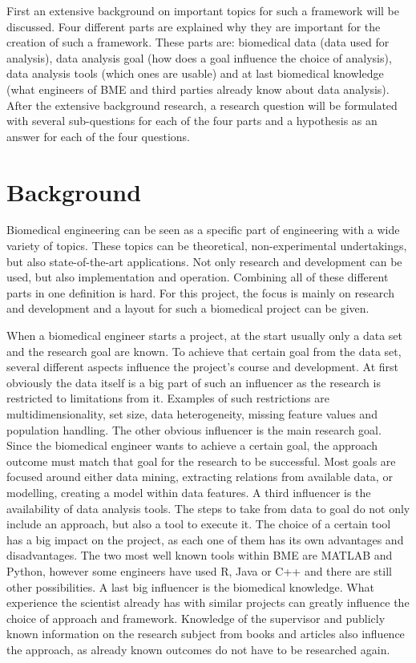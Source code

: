 \documentclass[10pt,a4paper]{article}
\begin{document}
	First an extensive background on important topics for such a framework will be discussed. Four different parts are explained why they are important for the creation of such a framework. These parts are: biomedical data (data used for analysis), data analysis goal (how does a goal influence the choice of analysis), data analysis tools (which ones are usable) and at last biomedical knowledge (what engineers of BME and third parties already know about data analysis). After the extensive background research, a research question will be formulated with several sub-questions for each of the four parts and a hypothesis as an answer for each of the four questions.
	
	\section{Background}
	\label{sec:Background}
	
	Biomedical engineering can be seen as a specific part of engineering with a wide variety of topics. These topics can be theoretical, non-experimental undertakings, but also state-of-the-art applications. Not only research and development can be used, but also implementation and operation. Combining all of these different parts in one definition is hard. \cite{bronzino2014biomedical} For this project, the focus is mainly on research and development and a layout for such a biomedical project can be given.
	
	When a biomedical engineer starts a project, at the start usually only a data set and the research goal are known. To achieve that certain goal from the data set, several different aspects influence the project's course and development. At first obviously the data itself is a big part of such an influencer as the research is restricted to limitations from it. Examples of such restrictions are multidimensionality, set size, data heterogeneity, missing feature values and population handling. The other obvious influencer is the main research goal. Since the biomedical engineer wants to achieve a certain goal, the approach outcome must match that goal for the research to be successful. Most goals are focused around either data mining, extracting relations from available data, or modelling, creating a model within data features. A third influencer is the availability of data analysis tools. The steps to take from data to goal do not only include an approach, but also a tool to execute it. The choice of a certain tool has a big impact on the project, as each one of them has its own advantages and disadvantages. The two most well known tools within BME are MATLAB and Python, however some engineers have used R, Java or C++ and there are still other possibilities. A last big influencer is the biomedical knowledge. What experience the scientist already has with similar projects can greatly influence the choice of approach and framework. Knowledge of the supervisor and publicly known information on the research subject from books and articles also influence the approach, as already known outcomes do not have to be researched again. 
	
\end{document}
